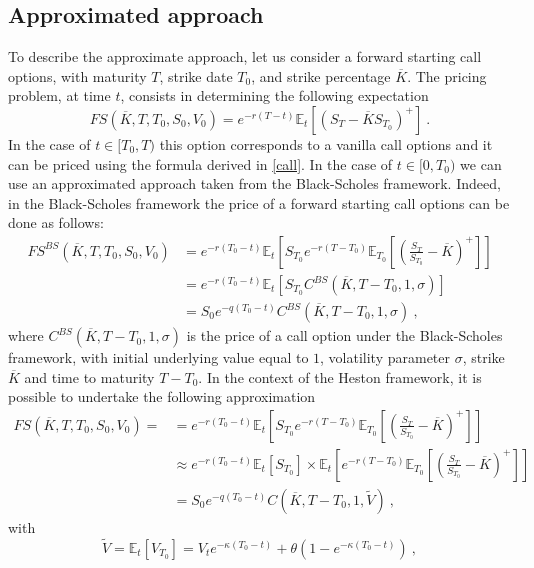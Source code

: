 \subsection{Approximated approach}
To describe the approximate approach, let us consider a forward starting call options, with maturity $T$, strike date $T_0$, and strike percentage $\overline{K}$. 
The pricing problem, at time $t$, consists in determining the following expectation
$$
FS(\overline{K}, T, T_0, S_0, V_0)  = e^{-r (T-t)}\mathbb{E}_t   \left[\left(S_T - \overline{K} S_{T_0}\right)^+\right] \ .
$$
In the case of $t \in [T_0, T)$ this option corresponds to a vanilla call options and it can be priced using the formula derived in \ref{call}. 
In the case of $t \in [0, T_0)$ we can use an approximated approach taken from the Black-Scholes framework. 
Indeed, in the Black-Scholes framework the price of a forward starting call options can be done as follows:
$$
\begin{aligned}
FS^{BS}(\overline{K}, T, T_0, S_0, V_0) 
&= e^{-r (T_0-t)} \mathbb{E}_t   \left[  S_{T_0}  e^{-r (T-T_0)} \mathbb{E}_{T_0} \left[ \left( \frac{S_T}{S_{T_0}} - \overline{K}\right)^+\right]       \right]
\\
&=
e^{-r (T_0-t)} \mathbb{E}_t \left[ S_{T_0}  C^{BS}(\overline{K}, T-T_0, 1 ,\sigma) \right] 
\\ &=S_0 e^{-q (T_0-t)}   C^{BS}(\overline{K}, T-T_0, 1 ,\sigma) \ , 
\end{aligned}
$$
where $C^{BS}(\overline{K}, T-T_0, 1 , \sigma)$ is the price of a call option under the Black-Scholes framework, with initial underlying value equal to $1$, volatility parameter $\sigma$, strike $\overline{K}$ and time to maturity $T-T_0$.
In the context of the Heston framework, it is possible to undertake the following approximation
$$
\begin{aligned}
FS(\overline{K}, T, T_0, S_0, V_0) = 
&= e^{-r (T_0-t)} \mathbb{E}_t   \left[  S_{T_0}  e^{-r (T-T_0)} \mathbb{E}_{T_0} \left[ \left( \frac{S_T}{S_{T_0}} - \overline{K}\right)^+\right]       \right]
\\
&\approx e^{-r (T_0-t)} \mathbb{E}_t   \left[  S_{T_0}  \right] \times \mathbb{E}_t \left[ e^{-r (T-T_0)} \mathbb{E}_{T_0} \left[ \left( \frac{S_T}{S_{T_0}} - \overline{K}\right)^+\right]       \right]
\\ 
&=
S_0 e^{-q (T_0-t)}   C(\overline{K}, T-T_0, 1, \tilde{V}) \ , 
\end{aligned}
$$
with
\begin{equation}
\label{vol-cir-exp}
\tilde{V} = \mathbb{E}_t[ V_{T_0} ] = V_t  e^{-\kappa  (T_0 -t) } + \theta \left(1 - e^{-\kappa   (T_0 -t) }\right) \ ,
\end{equation}

